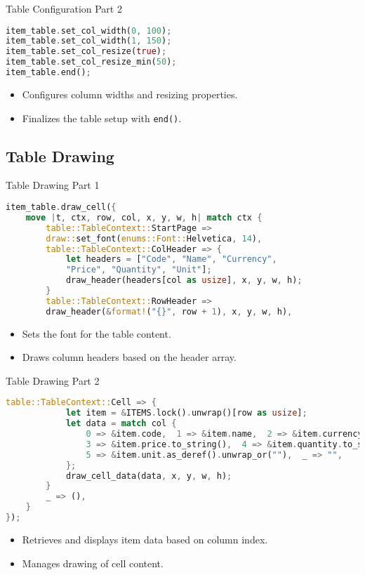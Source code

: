 \documentclass[aspectratio=169, table]{beamer}
\begin{document}
\begin{frame}[fragile]{Table Configuration Part 2}
\begin{lstlisting}[language=Rust]
item_table.set_col_width(0, 100);
item_table.set_col_width(1, 150);
item_table.set_col_resize(true);
item_table.set_col_resize_min(50);
item_table.end();
\end{lstlisting}

\begin{itemize}
\item Configures column widths and resizing properties.
\item Finalizes the table setup with \texttt{end()}.
\end{itemize}
\end{frame}

\subsection{Table Drawing}
\begin{frame}[fragile]{Table Drawing Part 1}
\begin{lstlisting}[language=Rust]
item_table.draw_cell({
	move |t, ctx, row, col, x, y, w, h| match ctx {
		table::TableContext::StartPage => 
		draw::set_font(enums::Font::Helvetica, 14),
		table::TableContext::ColHeader => {
			let headers = ["Code", "Name", "Currency", 
			"Price", "Quantity", "Unit"];
			draw_header(headers[col as usize], x, y, w, h);
		}
		table::TableContext::RowHeader => 
		draw_header(&format!("{}", row + 1), x, y, w, h),
	\end{lstlisting}
	
	\begin{itemize}
		\item Sets the font for the table content.
		\item Draws column headers based on the header array.
	\end{itemize}
\end{frame}

\begin{frame}[fragile]{Table Drawing Part 2}
	\vspace{15pt}
	\begin{lstlisting}[language=Rust]
		table::TableContext::Cell => {
			let item = &ITEMS.lock().unwrap()[row as usize];
			let data = match col {
				0 => &item.code,  1 => &item.name,  2 => &item.currency, 
				3 => &item.price.to_string(),  4 => &item.quantity.to_string(),
				5 => &item.unit.as_deref().unwrap_or(""),  _ => "",
			};
			draw_cell_data(data, x, y, w, h);
		}
		_ => (),
	}
});
\end{lstlisting}

\begin{itemize}
\item Retrieves and displays item data based on column index.
\item Manages drawing of cell content.
\end{itemize}
\end{frame}
\end{document}

